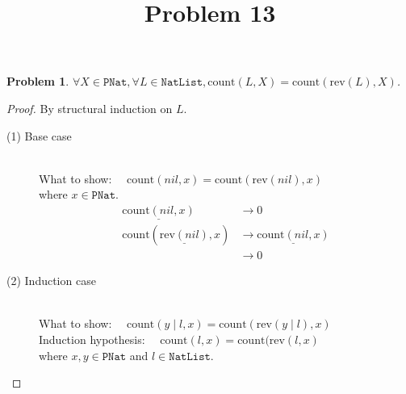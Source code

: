 \documentclass[12pt, a4paper]{article}
\title{Problem 13}
\date{\vspace{-5ex}}
\newtheorem{problem}{Problem}
\newcommand{\rmx}[1]{\mathrm{#1}}
\newcommand{\larrow}{\longrightarrow}
\newcommand{\under}{\underline}
\begin{document}
\maketitle


\begin{problem}
$\forall X \in \mathtt{PNat}, \forall L \in \mathtt{NatList}, \rmx{count}(L, X) = \rmx{count}(\rmx{rev}(L), X)$.
\end{problem}
\begin{proof}
By structural induction on $L$.

\begin{description}
\item[(1) Base case]~\\
\noindent
What to show: $\quad \rmx{count}(nil, x) = \rmx{count}(\rmx{rev}(nil), x)$\\
where $x \in \mathtt{PNat}$.
\begin{align*}
\under{\rmx{count}(nil, x)} 
	&\larrow 0 \tag{by cnt1} \\
\rmx{count}(\under{\rmx{rev}(nil)}, x)
	&\larrow \under{\rmx{count}(nil, x)} \tag{by rev1} \\
	&\larrow 0 \tag{by cnt1}
\end{align*}

\item[(2) Induction case]~\\
What to show: $\quad \rmx{count}(y \mid l, x) = \rmx{count}(\rmx{rev}(y \mid l), x)$ \\
Induction hypothesis: $\quad \rmx{count}(l, x) = \rmx{count}(\rmx{rev}(l, x)$  \\
where $x,y \in \mathtt{PNat}$ and $l \in \mathtt{NatList}$.


\end{description}
\end{proof}
\end{document}
